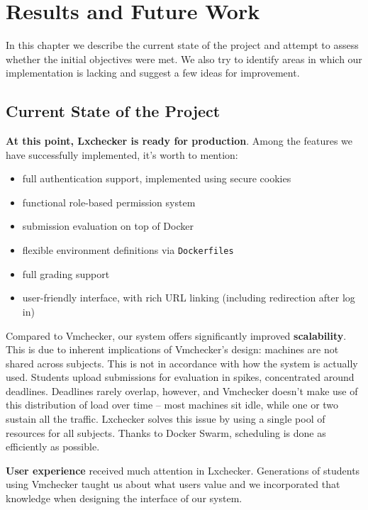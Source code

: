 \chapter{Results and Future Work}
\label{chapter:results}

In this chapter we describe the current state of the project and attempt to assess whether the initial objectives were met. We also try to identify areas in which our implementation is lacking and suggest a few ideas for improvement.


\section{Current State of the Project}
\label{sec:current-state}

\textbf{At this point, Lxchecker is ready for production}. Among the features we have successfully implemented, it's worth to mention:
\begin{itemize}
	\item full authentication support, implemented using secure cookies
	\item functional role-based permission system
	\item submission evaluation on top of Docker
	\item flexible environment definitions via \texttt{Dockerfiles}
	\item full grading support
	\item user-friendly interface, with rich URL linking (including redirection after log in)
\end{itemize}

Compared to Vmchecker, our system offers significantly improved \textbf{scalability}. This is due to inherent implications of Vmchecker's design: machines are not shared across subjects. This is not in accordance with how the system is actually used. Students upload submissions for evaluation in spikes, concentrated around deadlines. Deadlines rarely overlap, however, and Vmchecker doesn't make use of this distribution of load over time -- most machines sit idle, while one or two sustain all the traffic. Lxchecker solves this issue by using a single pool of resources for all subjects. Thanks to Docker Swarm, scheduling is done as efficiently as possible.

\textbf{User experience} received much attention in Lxchecker. Generations of students using Vmchecker taught us about what users value and we incorporated that knowledge when designing the interface of our system.

